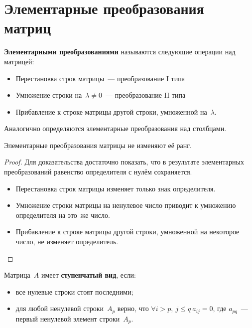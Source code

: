 \section{Элементарные преобразования матриц}
\textbf{Элементарными преобразованиями} называются следующие операции над матрицей:
\begin{itemize}
	\item Перестановка строк матрицы~--- преобразование I типа
	\item Умножение строки на~$\lambda \neq 0$~--- преобразование II типа
	\item Прибавление к строке матрицы другой строки, умноженной на~$\lambda$.
\end{itemize}

Аналогично определяются элементарные преобразования над столбцами.

\begin{theorem}
Элементарные преобразования матрицы не изменяют её ранг.
\end{theorem}
\begin{proof}
Для доказательства достаточно показать, что в результате элементарных преобразований равенство определителя с нулём сохраняется.
\begin{itemize}
	\item Перестановка строк матрицы изменяет только знак определителя.
	\item Умножение строки матрицы на ненулевое число приводит к умножению определителя на это~же число.
	\item Прибавление к строке матрицы другой строки, умноженной на некоторое число, не изменяет определитель.
\end{itemize}
\end{proof}

Матрица~$A$ имеет \textbf{ступенчатый вид}, если:
\begin{itemize}
	\item все нулевые строки стоят последними;
	\item для любой ненулевой строки~$A_p$ верно, что $\forall i > p, \ j \leqslant q \ a_{ij} = 0$, где $a_{pq}$~--- первый ненулевой элемент строки~$A_p$.
\end{itemize}

